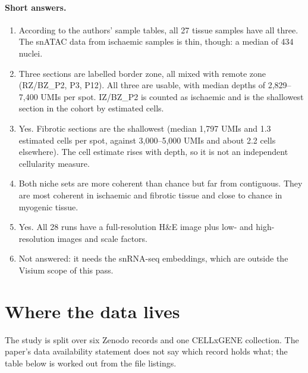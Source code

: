 \documentclass[11pt,a4paper]{article}
\begin{document}
\paragraph{Short answers.}
\begin{enumerate}
\item According to the authors' sample tables, all 27 tissue samples have all three. The snATAC data from ischaemic samples is thin, though: a median of 434 nuclei.
\item Three sections are labelled border zone, all mixed with remote zone (RZ/BZ\_P2, P3, P12). All three are usable, with median depths of 2,829--7,400 UMIs per spot. IZ/BZ\_P2 is counted as ischaemic and is the shallowest section in the cohort by estimated cells.
\item Yes. Fibrotic sections are the shallowest (median 1,797 UMIs and 1.3 estimated cells per spot, against 3,000--5,000 UMIs and about 2.2 cells elsewhere). The cell estimate rises with depth, so it is not an independent cellularity measure.
\item Both niche sets are more coherent than chance but far from contiguous. They are most coherent in ischaemic and fibrotic tissue and close to chance in myogenic tissue.
\item Yes. All 28 runs have a full-resolution H\&E image plus low- and high-resolution images and scale factors.
\item Not answered: it needs the snRNA-seq embeddings, which are outside the Visium scope of this pass.
\end{enumerate}

\clearpage
\section*{Where the data lives}

The study is split over six Zenodo records and one CELLxGENE collection. The paper's data availability statement does not say which record holds what; the table below is worked out from the file listings.
\end{document}
